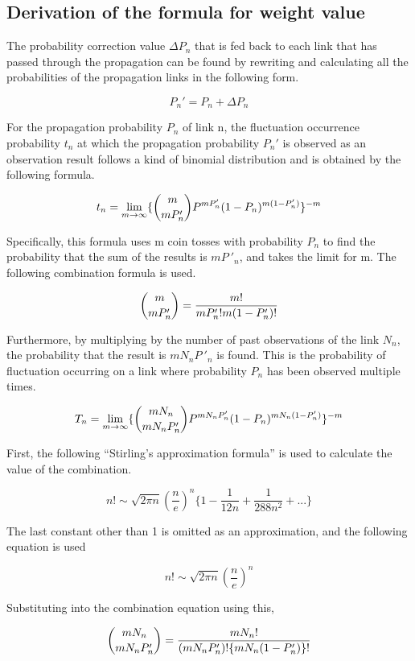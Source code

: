 \documentclass[12pt]{article}
\begin{document}
\subsection{Derivation of the formula for weight value}\label{derivation-of-the-formula-for-weight-value-w_n}

The probability correction value \(\Delta P_n\) that is fed back to each
link that has passed through the propagation can be found by rewriting
and calculating all the probabilities of the propagation links in the
following form.

\[ P_n'=P_n + \Delta P_n\]

For the propagation probability \(P_n\) of link n, the fluctuation
occurrence probability \(t_n\) at which the propagation probability
\(P_n'\) is observed as an observation result follows a kind of binomial
distribution and is obtained by the following formula.

\[ t_n=\lim_{m \to \infty }\{\dbinom{m}{mP_n'} P^{mP_n'} (1-P_n)^{m(1-P_n')} \}^{-m}\]

Specifically, this formula uses m coin tosses with probability \(P_n\)
to find the probability that the sum of the results is \(mP~{'}_n\), and
takes the limit for m. The following combination formula is used.

\[ \dbinom{m}{mP_n'} =\frac{m!}{mP_n'! m(1-P_n')!} \]

Furthermore, by multiplying by the number of past observations of the
link \(N_n\), the probability that the result is \(mN_nP~{'}_n\) is
found. This is the probability of fluctuation occurring on a link where
probability \(P_n\) has been observed multiple times.

\[ T_n=\lim_{m \to \infty }\{\dbinom{mN_n}{mN_nP_n'} P^{mN_nP_n'} (1-P_n)^{mN_n(1-P_n')} \}^{-m}\]

First, the following ``Stirling's approximation formula'' is used to
calculate the value of the combination.

\[n!\sim {\sqrt {2\pi n}}\left({\frac {n}{e}}\right)^{n}\{1-\frac{1}{12n}+\frac{1}{288n^2}+... \}\]

The last constant other than 1 is omitted as an approximation, and the
following equation is used

\[n!\sim {\sqrt {2\pi n}}\left({\frac {n}{e}}\right)^{n} \]

Substituting into the combination equation using this,

\[\dbinom{mN_n}{mN_nP_n'}=\frac{mN_n!}{(mN_nP_n')! \{mN_n(1-P_n')\}!} \]
\end{document}
